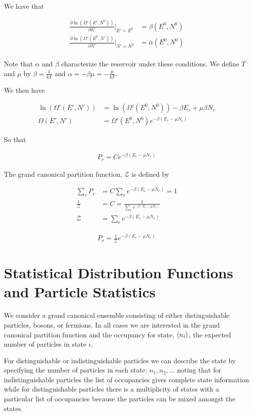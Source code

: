 \documentclass[12pt]{article}
\newcommand{\mc}[1]{\mathcal{#1}}
\begin{document}
We have that

\begin{align}
\frac{\partial \ln(\Omega'(E',N^0))}{\partial E'}\rvert_{E'=E^0}  &= \beta(E^0,N^0)\\
\frac{\partial \ln(\Omega'(E^0,N'))}{\partial N'}\rvert_{N'=N^0}  &= \alpha(E^0,N^0)\\
\end{align}

Note that $\alpha$ and $\beta$ characterize the reservoir under these conditions. We define $T$ and $\mu$ by $\beta = \frac{1}{kT}$ and $\alpha = -\beta \mu = -\frac{\mu}{kT}$.

We then have

\begin{align}
\ln(\Omega'(E',N')) &= \ln(\Omega'(E^0,N^0)) - \beta E_r + \mu \beta N_r\\
\Omega(E',N') &= \Omega'(E^0,N^0) e^{-\beta (E_r - \mu N_r)}
\end{align}

So that

\begin{align}
P_r = C e^{-\beta(E_r-\mu N_r)}
\end{align}

The grand canonical partition function, $\mc{Z}$ is defined by

\begin{align}
\sum_r P_r &= C\sum_r e^{-\beta(E_r-\mu N_r)} = 1\\
\frac{1}{\mc{Z}} &= C = \frac{1}{\sum_r e^{-\beta(E_r-\mu N_r)}}\\
\mc{Z} &= \sum_r e^{-\beta(E_r-\mu N_r)}
\end{align}

\begin{align}
P_r = \frac{1}{\mc{Z}} e^{-\beta(E_r-\mu N_r)}
\end{align}

\section{Statistical Distribution Functions and Particle Statistics}

We consider a grand canonical ensemble consisting of either distinguishable particles, bosons, or fermions. In all cases we are interested in the grand canonical partition function and the occupancy for state, $\braket{n_i}$, the expected number of particles in state $i$.

For distinguishable or indistinguishable particles we can describe the state by specifying the number of particles in each state: $n_1,n_2,\ldots$ noting that for indistinguishable particles the list of occupancies gives complete state information while for distinguishable particles there is a multiplicity of states with a particular list of occupancies because the particles can be mixed amongst the states.
\end{document}
